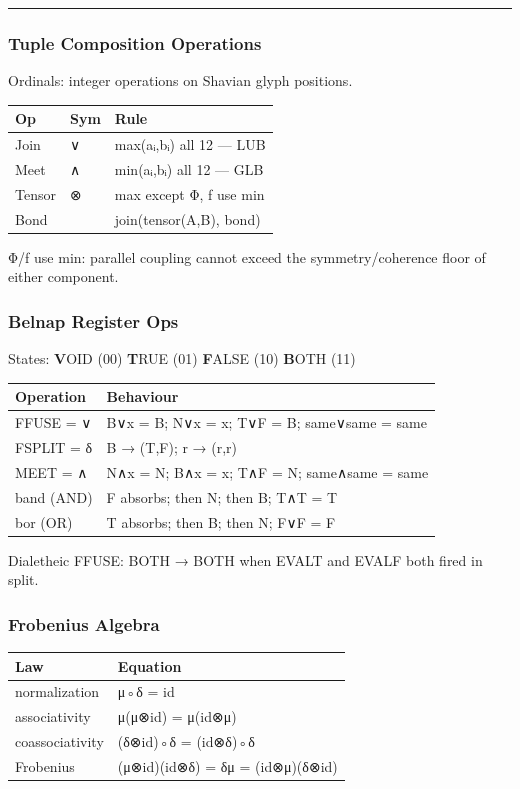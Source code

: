 \begin{center}\rule{0.5\linewidth}{0.5pt}\end{center}

\hypertarget{tuple-composition-operations}{%
\subsubsection{Tuple Composition
Operations}\label{tuple-composition-operations}}

Ordinals: integer operations on Shavian glyph positions.

\begin{longtable}[]{@{}lll@{}}
\toprule
Op & Sym & Rule\tabularnewline
\midrule
\endhead
Join & ∨ & max(aᵢ,bᵢ) all 12 --- LUB\tabularnewline
Meet & ∧ & min(aᵢ,bᵢ) all 12 --- GLB\tabularnewline
Tensor & ⊗ & max except Φ, ƒ use min\tabularnewline
Bond & & join(tensor(A,B), bond)\tabularnewline
\bottomrule
\end{longtable}

Φ/ƒ use min: parallel coupling cannot exceed the symmetry/coherence
floor of either component.

\hypertarget{belnap-register-ops}{%
\subsubsection{Belnap Register Ops}\label{belnap-register-ops}}

States: \textbf{V}OID (00) \textbf{T}RUE (01) \textbf{F}ALSE (10)
\textbf{B}OTH (11)

\begin{longtable}[]{@{}ll@{}}
\toprule
Operation & Behaviour\tabularnewline
\midrule
\endhead
FFUSE = ∨ & B∨x = B; N∨x = x; T∨F = B; same∨same = same\tabularnewline
FSPLIT = δ & B → (T,F); r → (r,r)\tabularnewline
MEET = ∧ & N∧x = N; B∧x = x; T∧F = N; same∧same = same\tabularnewline
band (AND) & F absorbs; then N; then B; T∧T = T\tabularnewline
bor (OR) & T absorbs; then B; then N; F∨F = F\tabularnewline
\bottomrule
\end{longtable}

Dialetheic FFUSE: BOTH → BOTH when EVALT and EVALF both fired in split.

\hypertarget{frobenius-algebra}{%
\subsubsection{Frobenius Algebra}\label{frobenius-algebra}}

\begin{longtable}[]{@{}ll@{}}
\toprule
Law & Equation\tabularnewline
\midrule
\endhead
normalization & μ◦δ = id\tabularnewline
associativity & μ(μ⊗id) = μ(id⊗μ)\tabularnewline
coassociativity & (δ⊗id)◦δ = (id⊗δ)◦δ\tabularnewline
Frobenius & (μ⊗id)(id⊗δ) = δμ = (id⊗μ)(δ⊗id)\tabularnewline
\bottomrule
\end{longtable}

